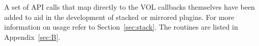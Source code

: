A set of API calls that map directly to the VOL callbacks themselves have been added to aid in the development of stacked or mirrored plugins. For more information on usage refer to Section~\ref{sec:stack}. The routines are listed in Appendix~\ref{sec:B}.

